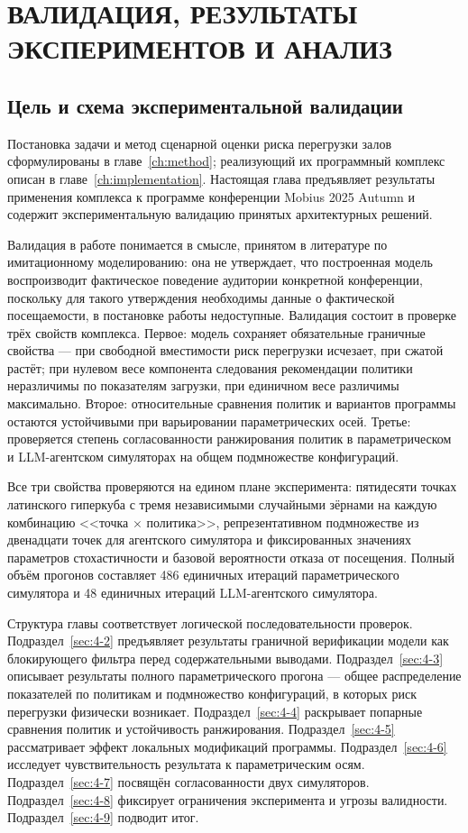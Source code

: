 \chapter{ВАЛИДАЦИЯ, РЕЗУЛЬТАТЫ ЭКСПЕРИМЕНТОВ И АНАЛИЗ}
\label{ch:results}
\sloppy


\section{Цель и схема экспериментальной валидации}
\label{sec:4-1}

Постановка задачи и метод сценарной оценки риска перегрузки залов сформулированы в главе~\ref{ch:method}; реализующий их программный комплекс описан в главе~\ref{ch:implementation}. Настоящая глава предъявляет результаты применения комплекса к программе конференции Mobius 2025 Autumn и содержит экспериментальную валидацию принятых архитектурных решений.

Валидация в работе понимается в смысле, принятом в литературе по имитационному моделированию: она не утверждает, что построенная модель воспроизводит фактическое поведение аудитории конкретной конференции, поскольку для такого утверждения необходимы данные о фактической посещаемости, в постановке работы недоступные. Валидация состоит в проверке трёх свойств комплекса. Первое: модель сохраняет обязательные граничные свойства --- при свободной вместимости риск перегрузки исчезает, при сжатой растёт; при нулевом весе компонента следования рекомендации политики неразличимы по показателям загрузки, при единичном весе различимы максимально. Второе: относительные сравнения политик и вариантов программы остаются устойчивыми при варьировании параметрических осей. Третье: проверяется степень согласованности ранжирования политик в параметрическом и LLM-агентском симуляторах на общем подмножестве конфигураций.

Все три свойства проверяются на едином плане эксперимента: пятидесяти точках латинского гиперкуба с тремя независимыми случайными зёрнами на каждую комбинацию <<точка $\times$ политика>>, репрезентативном подмножестве из двенадцати точек для агентского симулятора и фиксированных значениях параметров стохастичности и базовой вероятности отказа от посещения. Полный объём прогонов составляет 486 единичных итераций параметрического симулятора и 48 единичных итераций LLM-агентского симулятора.

Структура главы соответствует логической последовательности проверок. Подраздел~\ref{sec:4-2} предъявляет результаты граничной верификации модели как блокирующего фильтра перед содержательными выводами. Подраздел~\ref{sec:4-3} описывает результаты полного параметрического прогона --- общее распределение показателей по политикам и подмножество конфигураций, в которых риск перегрузки физически возникает. Подраздел~\ref{sec:4-4} раскрывает попарные сравнения политик и устойчивость ранжирования. Подраздел~\ref{sec:4-5} рассматривает эффект локальных модификаций программы. Подраздел~\ref{sec:4-6} исследует чувствительность результата к параметрическим осям. Подраздел~\ref{sec:4-7} посвящён согласованности двух симуляторов. Подраздел~\ref{sec:4-8} фиксирует ограничения эксперимента и угрозы валидности. Подраздел~\ref{sec:4-9} подводит итог.

